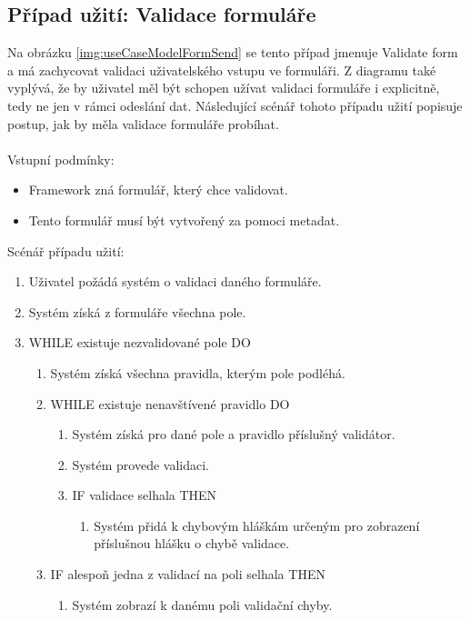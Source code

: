 \subsection{Případ užití: Validace formuláře}
Na obrázku \ref{img:useCaseModelFormSend} se tento případ jmenuje Validate form a má zachycovat validaci uživatelského vstupu ve formuláři. Z diagramu také vyplývá, že by uživatel měl být schopen užívat validaci formuláře i explicitně, tedy ne jen v rámci odeslání dat. Následující scénář tohoto případu užití popisuje postup, jak by měla validace formuláře probíhat.\\\\
Vstupní podmínky:
\begin{itemize}
\item Framework zná formulář, který chce validovat. 
\item Tento formulář musí být vytvořený za pomoci metadat.
\end{itemize}
Scénář případu užití:
\begin{enumerate}
\item Uživatel požádá systém o validaci daného formuláře.
\item Systém získá z formuláře všechna pole.
\item WHILE existuje nezvalidované pole DO
\begin{enumerate}
\item Systém získá všechna pravidla, kterým pole podléhá.
\item WHILE existuje nenavštívené pravidlo DO
\begin{enumerate}
\item Systém získá pro dané pole a pravidlo příslušný validátor.
\item Systém provede validaci.
\item IF validace selhala THEN
\begin{enumerate}
\item Systém přidá k chybovým hláškám určeným pro zobrazení příslušnou hlášku o chybě validace.
\end{enumerate}
\end{enumerate}
\item IF alespoň jedna z validací na poli selhala THEN
\begin{enumerate}
\item Systém zobrazí k danému poli validační chyby.
\end{enumerate}
\end{enumerate} 
\end{enumerate}

